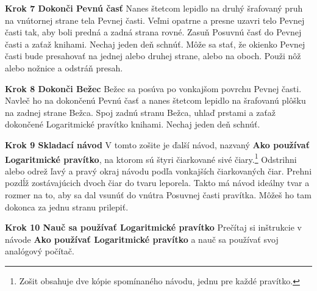 \begin{multicols*}{3}
{  \textbf{Krok 7 Dokonči Pevnú časť} Nanes štetcom lepidlo na druhý šrafovaný pruh na vnútornej strane tela Pevnej časti. Veľmi opatrne a presne uzavri telo Pevnej časti tak, aby boli predná a zadná strana rovné. Zasuň Posuvnú časť do Pevnej časti a zaťaž knihami. Nechaj jeden deň schnúť.
Môže sa stať, že okienko Pevnej časti bude presahovať na jednej alebo druhej strane, alebo na oboch. Použi nôž alebo nožnice a odstráň presah.

  \textbf{Krok 8 Dokonči Bežec} Bežec sa posúva po vonkajšom povrchu Pevnej časti. Navleč ho na dokončenú Pevnú časť a nanes štetcom lepidlo na šrafovanú plôšku na zadnej strane Bežca. Spoj zadnú stranu Bežca, uhlaď prstami a zaťaž dokončené Logaritmické pravítko knihami. Nechaj jeden deň schnúť.

  \textbf{Krok 9 Skladací návod} V tomto zošite je ďalší návod, nazvaný \textbf{Ako používať Logaritmické pravítko}, na ktorom sú štyri čiarkované sivé čiary.\footnote{Zošit obsahuje dve kópie spomínaného návodu, jednu pre každé pravítko.} Odstrihni alebo odrež ľavý a pravý okraj návodu podľa vonkajších čiarkovaných čiar. Prehni pozdĺž zostávajúcich dvoch čiar do tvaru leporela. Takto má návod ideálny tvar a rozmer na to, aby sa dal vsunúť do vnútra Posuvnej časti pravítka. Môžeš ho tam dokonca za jednu stranu prilepiť.

  \textbf{Krok 10 Nauč sa používať Logaritmické pravítko} Prečítaj si inštrukcie v návode \textbf{Ako používať Logaritmické pravítko} a nauč sa používať svoj analógový počítač.

  }
  \end{multicols*}
  

